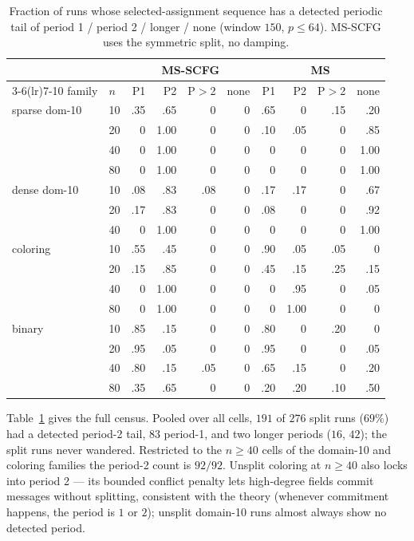 \begin{table}[t]
\centering
\caption{Fraction of runs whose selected-assignment sequence has a
detected periodic tail of period 1 / period 2 / longer / none (window
$150$, $p \le 64$).  MS-SCFG uses the symmetric split, no damping.}
\label{tab:census}
\scriptsize
\begin{tabular}{llrrrrrrrr}
\toprule
& & \multicolumn{4}{c}{MS-SCFG} & \multicolumn{4}{c}{MS} \\
\cmidrule(lr){3-6}\cmidrule(lr){7-10}
family & $n$ & P1 & P2 & P$>$2 & none & P1 & P2 & P$>$2 & none \\
\midrule
sparse dom-10 & 10 & .35 & .65 & 0 & 0 & .65 & 0 & .15 & .20 \\
 & 20 & 0 & 1.00 & 0 & 0 & .10 & .05 & 0 & .85 \\
 & 40 & 0 & 1.00 & 0 & 0 & 0 & 0 & 0 & 1.00 \\
 & 80 & 0 & 1.00 & 0 & 0 & 0 & 0 & 0 & 1.00 \\
dense dom-10 & 10 & .08 & .83 & .08 & 0 & .17 & .17 & 0 & .67 \\
 & 20 & .17 & .83 & 0 & 0 & .08 & 0 & 0 & .92 \\
 & 40 & 0 & 1.00 & 0 & 0 & 0 & 0 & 0 & 1.00 \\
coloring & 10 & .55 & .45 & 0 & 0 & .90 & .05 & .05 & 0 \\
 & 20 & .15 & .85 & 0 & 0 & .45 & .15 & .25 & .15 \\
 & 40 & 0 & 1.00 & 0 & 0 & 0 & .95 & 0 & .05 \\
 & 80 & 0 & 1.00 & 0 & 0 & 0 & 1.00 & 0 & 0 \\
binary & 10 & .85 & .15 & 0 & 0 & .80 & 0 & .20 & 0 \\
 & 20 & .95 & .05 & 0 & 0 & .95 & 0 & 0 & .05 \\
 & 40 & .80 & .15 & .05 & 0 & .65 & .15 & 0 & .20 \\
 & 80 & .35 & .65 & 0 & 0 & .20 & .20 & .10 & .50 \\
\bottomrule
\end{tabular}
\end{table}

Table~\ref{tab:census} gives the full census.  Pooled over all cells,
$191$ of $276$ split runs ($69\%$) had a detected period-2 tail, $83$
period-1, and two longer periods ($16$, $42$); the split runs never
wandered.  Restricted to the $n \ge 40$ cells of the domain-10 and
coloring families the period-2 count is $92/92$.  Unsplit coloring at
$n \ge 40$ also locks into period 2 --- its bounded conflict penalty
lets high-degree fields commit messages without splitting, consistent
with the theory (whenever commitment happens, the period is $1$ or
$2$); unsplit domain-10 runs almost always show no detected period.

